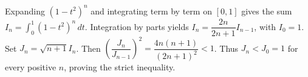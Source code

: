 Expanding $(1-t^2)^n$ and integrating term by term on $[0,1]$ gives the sum $I_n=\int_0^1(1-t^2)^n\,dt$. Integration by parts yields $I_n=\dfrac{2n}{2n+1}I_{n-1}$, with $I_0=1$. Set $J_n=\sqrt{n+1}I_n$. Then $\left(\dfrac{J_n}{J_{n-1}}\right)^2=\dfrac{4n(n+1)}{(2n+1)^2}<1$. Thus $J_n<J_0=1$ for every positive $n$, proving the strict inequality.
